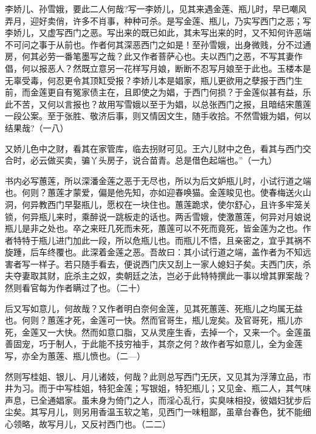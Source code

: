 {李娇儿、孙雪娥，要此二人何哉?写一李娇儿，见其来遇金莲、瓶儿时，早已嘲风弄月，迎好卖俏，许多不肖事，种种可杀。是写金莲、瓶儿，乃实写西门之恶；写李娇儿，又虚写西门之恶。写出来的既已如此，其未写出来的时，又不知何许恶端不可问之事于从前也。作者何其深恶西门之如是！至孙雪娥，出身微贱，分不过通房，何其必劳一番笔墨写之哉？此又作者菩萨心也。夫以西门之恶，不写其妻作倡，何以报恶人？然既立意另一花样写月娘，断断不忍写月娘至于此也。玉楼本是无辜受毒，何忍更令其顶缸受报？李娇儿本是娼家，瓶儿更欲用之孽报于西门生前，而金莲更自有冤家债主在，且即使之为娼，于西门何损？于金莲似甚有益，乐此不苦，又何以言报也？故用写雪娥以至于为娼，以总张西门之报，且暗结宋蕙莲一段公案。至于张胜、敬济后事，则又情因文生，随手收拾。不然雪娥为娼，何以结果哉?（一八）

又娇儿色中之财，看其在家管库，临去拐财可见。王六儿财中之色，看其与西门交合时，必云做买卖，骗丫头房子，说合苗青。总是借色起端也。”（一九）

书内必写蕙莲，所以深潘金莲之恶于无尽也，所以为后文妒瓶儿时，小试行道之端也。何则？蕙莲才蒙爱，偏是他先知，亦如迎春唤猫。金莲睃见也。使春梅送火山洞，何异教西门早娶瓶儿，愿权在一块住也。蕙莲跪求，使尔舒心，且许多牢笼关锁，何异瓶儿来时，乘醉说一跳板走的话也。两舌雪娥，使激蕙莲，何异对月娘说瓶儿是非之处也。卒之来旺几死而未死，蕙莲可以不死而竟死，皆金莲为之也。作者特特于瓶儿进门加此一段，所以危瓶儿也。而瓶儿不悟，且亲密之，宜乎其祸不旋踵，后车终覆也。此深着金莲之恶。吾故曰：其小试行道之端，盖作者为不知远害者写一样子。若只随手看去，便说西门庆又刮上一家人媳妇子矣。夫西门庆，杀夫夺妻取其财，庇杀主之奴，卖朝廷之法，岂必于此特特撰此一事以增其罪案哉？然则看官每为作者瞒过了也。（二十）

后又写如意儿，何故哉？又作者明白奈何金莲，见其死蕙莲、死瓶儿之均属无益也。何则？蕙莲才死，金莲可一快。然而官哥生，瓶儿宠矣。及官哥死，瓶儿亦死，金莲又一大快。然而如意口脂，又从灵座生香，去掉一个，又来一个。金莲虽善固宠，巧于制人，于此能不技穷袖手，其奈之何？故作者写如意儿，全为金莲写，亦全为蕙莲、瓶儿愤也。（二—）

然则写桂姐、银儿、月儿诸妓，何哉？此则总写西门无厌，又见其为浮薄立品，市井为习。而于中写桂姐，特犯金莲；写银姐，特犯瓶儿；又见金、瓶二人，其气味声息，已全通娼家。虽未身为倚门之人，而淫心乱行，实臭味相投，彼娼妇犹步后尘矣。其写月儿，则另用香温玉软之笔，见西门一味粗鄙，虽章台春色，犹不能细心领略，故写月儿，又反衬西门也。（二二）

}

